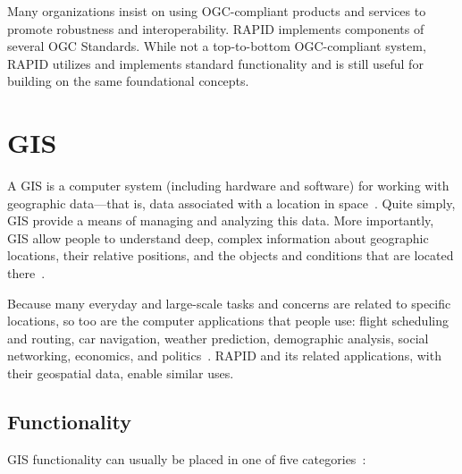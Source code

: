 Many organizations insist on using OGC-compliant products and services to promote robustness and interoperability. RAPID implements components of several OGC Standards. While not a top-to-bottom OGC-compliant system, RAPID utilizes and implements standard functionality and is still useful for building on the same foundational concepts.

\section{GIS}
A GIS is a computer system (including hardware and software) for working with geographic data---that is, data associated with a location in space~\cite{Esriintro}. Quite simply, GIS provide a means of managing and analyzing this data. More importantly, GIS allow people to understand deep, complex information about geographic locations, their relative positions, and the objects and conditions that are located there~\cite{Esriintro}.

Because many everyday and large-scale tasks and concerns are related to specific locations, so too are the computer applications that people use: flight scheduling and routing, car navigation, weather prediction, demographic analysis, social networking, economics, and politics~\cite{Esriintro}. RAPID and its related applications, with their geospatial data, enable similar uses.

\subsection{Functionality}
GIS functionality can usually be placed in one of five categories~\cite{Esriintro}:


